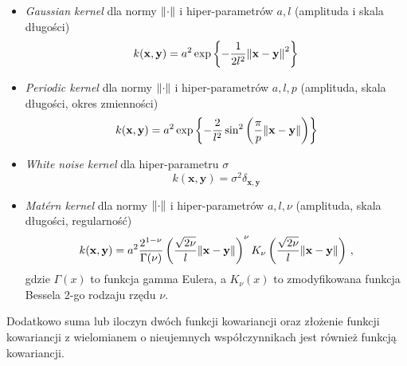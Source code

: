 \documentclass{myclass}
\begin{document}
\begin{itemize}
    \item \textit{Gaussian kernel} dla normy \(\norm{\cdot}\) i hiper-parametrów \(a,l\) (amplituda
    i skala długości)
    \begin{equation*}
        k(\mathbf{x}, \mathbf{y}) = a^2\exp\left\{-\frac{1}{2l^2}\norm{\mathbf{x} - \mathbf{y}}^2\right\}
    \end{equation*}
    
    \item \textit{Periodic kernel} dla normy \(\norm{\cdot}\) i hiper-parametrów \(a, l, p\)
    (amplituda, skala długości, okres zmienności)
    \begin{equation*}
        k(\mathbf{x},\mathbf{y}) = a^2\exp\left\{-\frac{2}{l^2}\sin^2\left(\frac{\pi}{p}\norm{\mathbf{x} - \mathbf{y}}\right)\right\}
    \end{equation*}

    \item \textit{White noise kernel} dla hiper-parametru \(\sigma\)
    \begin{equation*}
        k(\mathbf{x},\mathbf{y}) = \sigma^2 \delta_{\mathbf{x},\mathbf{y}}
    \end{equation*}

    \item \textit{Mat\'ern kernel} dla normy \(\norm{\cdot}\) i hiper-parametrów \(a, l, \nu\)
    (amplituda, skala długości, regularność)
    \begin{equation*}
        k(\mathbf{x},\mathbf{y}) = a^2 \frac{2^{1-\nu}}{\Gamma(\nu)}\left(\frac{\sqrt{2\nu}}{l}\norm{\mathbf{x} - \mathbf{y}}\right)^\nu K_\nu\left(\frac{\sqrt{2\nu}}{l}\norm{\mathbf{x} - \mathbf{y}}\right)\,,
    \end{equation*}
    gdzie \(\Gamma(x)\) to funkcja gamma Eulera, a \(K_\nu(x)\) to zmodyfikowana funkcja Bessela
    2-go rodzaju rzędu \(\nu\).

\end{itemize}
Dodatkowo suma lub iloczyn dwóch funkcji kowariancji oraz złożenie funkcji kowariancji z wielomianem
o nieujemnych współczynnikach jest również funkcją kowariancji.
\end{document}

